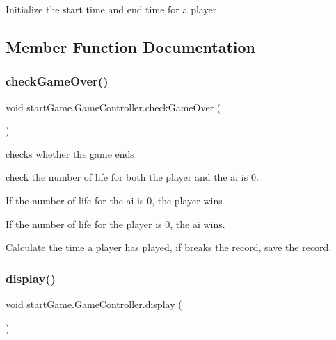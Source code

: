 Initialize the start time and end time for a player

\subsection{Member Function Documentation}
\hypertarget{classstart_game_1_1_game_controller_a3e2fb04603f5a7482672b3b5d1afe568}{}\label{classstart_game_1_1_game_controller_a3e2fb04603f5a7482672b3b5d1afe568} 
\subsubsection{\texorpdfstring{check\+Game\+Over()}{checkGameOver()}}
{\footnotesize\ttfamily void start\+Game.\+Game\+Controller.\+check\+Game\+Over (\begin{DoxyParamCaption}{ }\end{DoxyParamCaption})\hspace{0.3cm}{\ttfamily [private]}}



checks whether the game ends 

check the number of life for both the player and the ai is 0. 
\begin{DoxyItemize}
\item If the number of life for the ai is 0, the player wins
\item If the number of life for the player is 0, the ai wins.
\item Calculate the time a player has played, if breaks the record, save the record.
\end{DoxyItemize}\hypertarget{classstart_game_1_1_game_controller_abe07c8d60c3adbb0993e637b8c725884}{}\label{classstart_game_1_1_game_controller_abe07c8d60c3adbb0993e637b8c725884} 
\subsubsection{\texorpdfstring{display()}{display()}}
{\footnotesize\ttfamily void start\+Game.\+Game\+Controller.\+display (\begin{DoxyParamCaption}{ }\end{DoxyParamCaption})}



